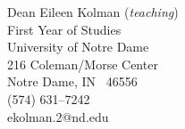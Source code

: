 \documentclass[11pt]{article}
\begin{document}
\vspace{0.25in}
\parbox[t]{0.5in}{\hspace{1in}}
\parbox[t]{3.25in}
     {Dean Eileen Kolman ({\em{teaching}})\\
       First Year of Studies \\
       University of Notre Dame \\
							216 Coleman/Morse Center\\
       Notre Dame, IN \ 46556 \\
       (574) 631--7242 \\
       ekolman.2@nd.edu
     }
\end{document}
